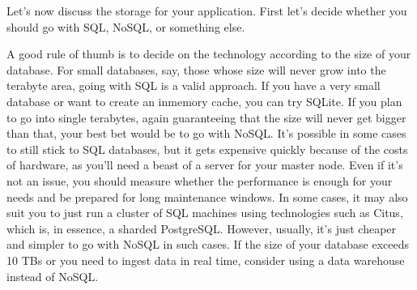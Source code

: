 Let's now discuss the storage for your application. First let's decide whether you should go with SQL, NoSQL, or something else.

A good rule of thumb is to decide on the technology according to the size of your database. For small databases, say, those whose size will never grow into the terabyte area, going with SQL is a valid approach. If you have a very small database or want to create an inmemory cache, you can try SQLite. If you plan to go into single terabytes, again guaranteeing that the size will never get bigger than that, your best bet would be to go with NoSQL. It's possible in some cases to still stick to SQL databases, but it gets expensive quickly because of the costs of hardware, as you'll need a beast of a server for your master node. Even if it's not an issue, you should measure whether the performance is enough for your needs and be prepared for long maintenance windows. In some cases, it may also suit you to just run a cluster of SQL machines using technologies such as Citus, which is, in essence, a sharded PostgreSQL. However, usually, it's just cheaper and simpler to go with NoSQL in such cases. If the size of your database exceeds 10 TBs or you need to ingest data in real time, consider using a data warehouse instead of NoSQL.